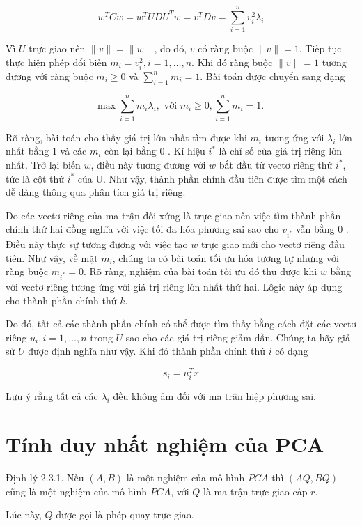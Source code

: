 \documentclass[12pt,a4paper,oneside]{report}
\numberwithin{equation}{section}
\begin{document}
$$
w^{T} C w=w^{T} U D U^{T} w=v^{T} D v=\sum_{i=1}^{n} v_{i}^{2} \lambda_{i}
$$

Vì $U$ trực giao nên $\|v\|=\|w\|$, do đó, $v$ có ràng buộc $\|v\|=1$. Tiếp tục thực hiện phép đổi biến $m_{i}=v_{i}^{2}, i=1, \ldots, n$. Khi đó ràng buộc $\|v\|=1$ tương đương với ràng buộc $m_{i} \geq 0$ và $\sum_{i=1}^{n} m_{i}=1$. Bài toán được chuyển sang dạng

$$
\max \sum_{i=1}^{n} m_{i} \lambda_{i}, \text { với } m_{i} \geq 0, \sum_{i=1}^{n} m_{i}=1 \text {. }
$$

Rõ ràng, bài toán cho thấy giá trị lớn nhất tìm được khi $m_{i}$ tương ứng với $\lambda_{i}$ lớn nhất bằng 1 và các $m_{i}$ còn lại bằng 0 . Kí hiệu $i^{*}$ là chỉ số của giá trị riêng lớn nhất. Trở lại biến $w$, điều này tương đương với $w$ bắt đầu từ vectơ riêng thứ $i^{*}$, tức là cột thứ $i^{*}$ của U. Như vậy, thành phần chính đầu tiên được tìm một cách dễ dàng thông qua phân tích giá trị riêng.

Do các vectơ riêng của ma trận đối xứng là trực giao nên việc tìm thành phần chính thứ hai đồng nghĩa với việc tối đa hóa phương sai sao cho $v_{i^{*}}$ vẫn bằng 0 . Điều này thực sự tương đương với việc tạo $w$ trực giao mới cho vectơ riêng đầu tiên. Như vậy, về mặt $m_{i}$, chúng ta có bài toán tối ưu hóa tương tự nhưng với ràng buộc $m_{i^{*}}=0$. Rõ ràng, nghiệm của bài toán tối ưu đó thu được khi $w$ bằng với vectơ riêng tương ứng với giá trị riêng lớn nhất thứ hai. Lôgic này áp dụng cho thành phần chính thứ $k$.

Do đó, tất cả các thành phần chính có thể được tìm thấy bằng cách đặt các vectơ riêng $u_{i}, i=1, \ldots, n$ trong $U$ sao cho các giá trị riêng giảm dần. Chúng ta hãy giả sử $U$ được định nghĩa như vậy. Khi đó thành phần chính thứ $i$ có dạng

$$
s_{i}=u_{i}^{T} x
$$

Lưu ý rằng tất cả các $\lambda_{i}$ đều không âm đối với ma trận hiệp phương sai.



\section{Tính duy nhất nghiệm của PCA}

Định lý 2.3.1. Nếu $(A, B)$ là một nghiệm của mô hình $P C A$ thì $(A Q, B Q)$ cũng là một nghiệm của mô hình $P C A$, với $Q$ là ma trận trực giao cấp $r$.

Lúc này, $Q$ được gọi là phép quay trực giao.
\end{document}
